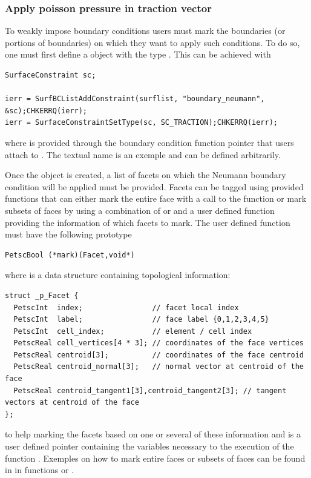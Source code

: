 \subsubsection{Apply poisson pressure in traction vector} %
\label{ssub:apply_poisson_pressure_in_traction_vector}
To weakly impose boundary conditions users must mark the boundaries (or portions of boundaries) on which they want to apply such conditions.
To do so, one must first define a  object with the type .
This can be achieved with
\begin{lstlisting}
SurfaceConstraint sc;

ierr = SurfBCListAddConstraint(surflist, "boundary_neumann", &sc);CHKERRQ(ierr);
ierr = SurfaceConstraintSetType(sc, SC_TRACTION);CHKERRQ(ierr);
 \end{lstlisting} 
where  is provided through the boundary condition function pointer that users attach to .
The textual name  is an exemple and can be defined arbitrarily.

Once the object is created, a list of facets on which the Neumann boundary condition will be applied must be provided.
Facets can be tagged using provided functions that can either mark the entire face with a call to the function  or mark subsets of faces by using a combination of  or  and a user defined function providing the information of which facets to mark.
The user defined function must have the following prototype
\begin{lstlisting}
PetscBool (*mark)(Facet,void*)
\end{lstlisting}
where  is a data structure containing topological information:
\begin{lstlisting}
struct _p_Facet {
  PetscInt  index;                // facet local index
  PetscInt  label;                // face label {0,1,2,3,4,5}
  PetscInt  cell_index;           // element / cell index
  PetscReal cell_vertices[4 * 3]; // coordinates of the face vertices
  PetscReal centroid[3];          // coordinates of the face centroid
  PetscReal centroid_normal[3];   // normal vector at centroid of the face
  PetscReal centroid_tangent1[3],centroid_tangent2[3]; // tangent vectors at centroid of the face
};
\end{lstlisting}
to help marking the facets based on one or several of these information and  is a user defined pointer containing the variables necessary to the execution of the function .
Exemples on how to mark entire faces or subsets of faces can be found in  in functions  or .

